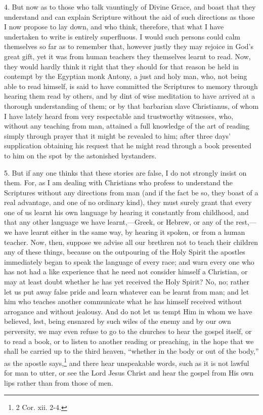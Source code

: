 4. But now as to those who talk vauntingly of Divine Grace, and boast that they understand and can explain Scripture without the aid of such directions as those I now propose to lay down, and who think, therefore, that what I have undertaken to write is entirely superfluous. I would such persons could calm themselves so far as to remember that, however justly they may rejoice in God’s great gift, yet it was from human teachers they themselves learnt to read. Now, they would hardly think it right that they should for that reason be held in contempt by the Egyptian monk Antony, a just and holy man, who, not being able to read himself, is said to have committed the Scriptures to memory through hearing them read by others, and by dint of wise meditation to have arrived at a  thorough understanding of them; or by that barbarian slave Christianus, of whom I have lately heard from very respectable and trustworthy witnesses, who, without any teaching from man, attained a full knowledge of the art of reading simply through prayer that it might be revealed to him; after three days’ supplication obtaining his request that he might read through a book presented to him on the spot by the astonished bystanders.

5. But if any one thinks that these stories are false, I do not strongly insist on them. For, as I am dealing with Christians who profess to understand the Scriptures without any directions from man (and if the fact be so, they boast of a real advantage, and one of no ordinary kind), they must surely grant that every one of us learnt his own language by hearing it constantly from childhood, and that any other language we have learnt,—Greek, or Hebrew, or any of the rest,—we have learnt either in the same way, by hearing it spoken, or from a human teacher. Now, then, suppose we advise all our brethren not to teach their children any of these things, because on the outpouring of the Holy Spirit the apostles immediately began to speak the language of every race; and warn every one who has not had a like experience that he need not consider himself a Christian, or may at least doubt whether he has yet received the Holy Spirit? No, no; rather let us put away false pride and learn whatever can be learnt from man; and let him who teaches another communicate what he has himself received without arrogance and without jealousy. And do not let us tempt Him in whom we have believed, lest, being ensnared by such wiles of the enemy and by our own perversity, we may even refuse to go to the churches to hear the gospel itself, or to read a book, or to listen to another reading or preaching, in the hope that we shall be carried up to the third heaven, “whether in the body or out of the body,” as the apostle says,\footnote{2 Cor. xii. 2-4.} and there hear unspeakable words, such as it is not lawful for man to utter, or see the Lord Jesus Christ and hear the gospel from His own lips rather than from those of men.

